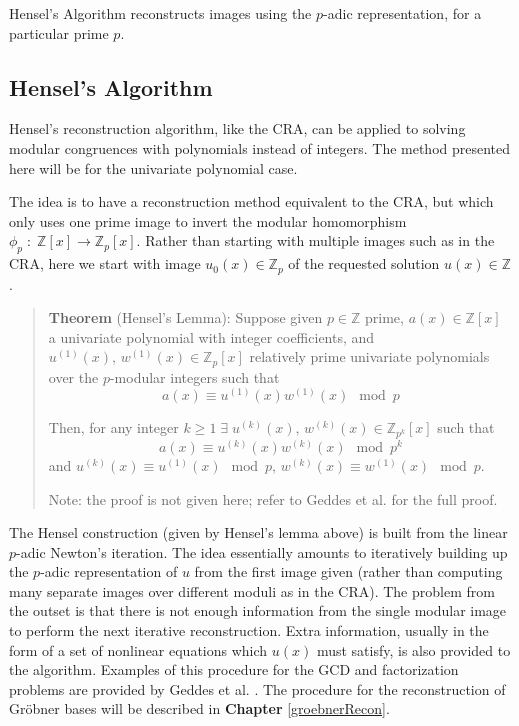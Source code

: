 \documentclass[letterpaper,12pt,titlepage,oneside,final]{book}
\newenvironment{theorem}{\begin{quote}%
  \textbf{Theorem }%
  \quad
}{%
\end{quote}%
}
\begin{document}
Hensel's Algorithm reconstructs images using the ${p}$-adic representation, for a particular prime ${p}$.

\subsection{Hensel's Algorithm}

Hensel's reconstruction algorithm, like the CRA, can be applied to solving modular congruences with polynomials instead of integers.  The method presented here will be for the univariate polynomial case.  

The idea is to have a reconstruction method equivalent to the CRA, but which only uses one prime image to invert the modular homomorphism ${\phi_p\; : \; \mathbb{Z}[x] \rightarrow \mathbb{Z}_p[x]}$.  Rather than starting with multiple images such as in the CRA, here we start with image ${u_0(x) \in \mathbb{Z}_p}$ of the requested solution ${u(x) \in \mathbb{Z}}$.

\begin{theorem}\label{hensel's lemma}
  (Hensel's Lemma): Suppose given ${p \in \mathbb{Z}}$ prime, ${a(x) \in \mathbb{Z}[x]}$ a univariate polynomial with integer coefficients, and ${u^{(1)}(x),\, w^{(1)}(x) \in \mathbb{Z}_p[x]}$ relatively prime univariate polynomials over the ${p}$-modular integers such that
  \begin{equation*}
    a(x) \equiv u^{(1)}(x)w^{(1)}(x) \mod p
  \end{equation*}

  Then, for any integer ${k \geq 1 \; \exists \; u^{(k)}(x),\, w^{(k)}(x) \in \mathbb{Z}_{p^k}[x]}$ such that 
  \begin{equation*}
    a(x) \equiv u^{(k)}(x)w^{(k)}(x) \mod p^k
  \end{equation*}
  and ${u^{(k)}(x) \equiv u^{(1)}(x) \mod p}$, ${w^{(k)}(x) \equiv w^{(1)}(x) \mod p}$. 

  Note: the proof is not given here; refer to Geddes et al. \cite{Geddes} for the full proof.
\end{theorem}           

The Hensel construction (given by Hensel's lemma above) is built from the linear ${p}$-adic Newton's iteration.  The idea essentially amounts to iteratively building up the ${p}$-adic representation of ${u}$ from the first image given (rather than computing many separate images over different moduli as in the CRA).  The problem from the outset is that there is not enough information from the single modular image to perform the next iterative reconstruction.  Extra information, usually in the form of a set of nonlinear equations which ${u(x)}$ must satisfy, is also provided to the algorithm.  Examples of this procedure for the GCD and factorization problems are provided by Geddes et al. \cite{Geddes}.  The procedure for the reconstruction of Gr\"obner bases will be described in \textbf{Chapter} \ref{groebnerRecon}. 
\end{document}
